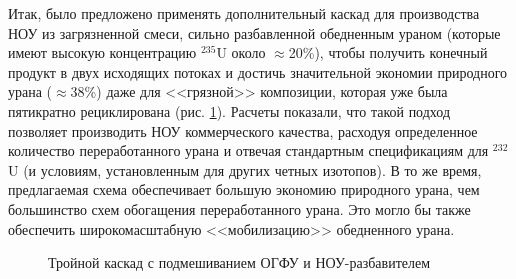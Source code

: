 Итак, было предложено применять дополнительный каскад для производства НОУ из загрязненной смеси, сильно разбавленной обедненным ураном (которые имеют высокую концентрацию $^{235}$U около $\approx$20\%), чтобы получить конечный продукт в двух исходящих потоках и достичь значительной экономии природного урана ($\approx$38\%) даже для <<грязной>> композиции, которая уже была пятикратно рециклирована (рис. \ref{fig:Tomsk}). Расчеты показали, что такой подход позволяет производить НОУ коммерческого качества, расходуя определенное количество переработанного урана и отвечая стандартным спецификациям для  $^{232}$U (и условиям, установленным для других четных изотопов). В то же время, предлагаемая схема обеспечивает большую экономию природного урана, чем большинство схем обогащения переработанного урана. Это могло бы также обеспечить широкомасштабную <<мобилизацию>> обедненного урана.

\begin{figure}[ht]
  \caption{Тройной каскад с подмешиванием ОГФУ и НОУ-разбавителем}\label{fig:Tomsk}
\end{figure}

